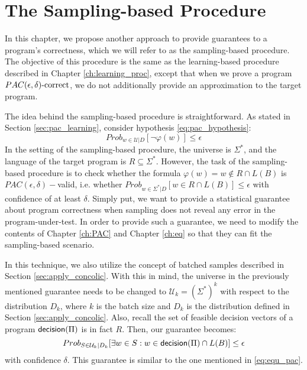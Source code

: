 \chapter{The Sampling-based Procedure}\label{ch:sampling_proc}

In this chapter, we propose another approach to provide guarantees to a program's correctness, which we will refer to as the sampling-based procedure. The objective of this procedure is the same as the learning-based procedure described in Chapter \ref{ch:learning_proc}, except that when we prove a program $PAC(\epsilon, \delta)\text{-correct}$, we do not additionally provide an approximation to the target program. 

The idea behind the sampling-based procedure is straightforward. As stated in Section \ref{sec:pac_learning}, consider hypothesis \ref{eq:pac_hypothesis}:
\begin{equation*}
Prob_{w \in \mathcal{U}|D} [\neg \varphi (w)] \leq \epsilon
\end{equation*}
In the setting of the sampling-based procedure, the universe is $\Sigma^\ast$, and the language of the target program is $R \subseteq \Sigma^\ast$. However, the task of the sampling-based procedure is to check whether the formula $\varphi(w) = w \notin R \cap L(B)$ is $PAC(\epsilon, \delta)-$valid, i.e. whether $Prob_{w \in \Sigma^\ast | D } [w \in R \cap L(B)] \leq \epsilon$ with confidence of at least $\delta$. Simply put, we want to provide a statistical guarantee about program correctness when sampling does not reveal any error in the program-under-test. In order to provide such a guarantee, we need to modify the contents of Chapter \ref{ch:PAC} and Chapter \ref{ch:eq} so that they can fit the sampling-based scenario.

In this technique, we also utilize the concept of batched samples described in Section \ref{sec:apply_concolic}. With this in mind, the universe in the previously mentioned guarantee needs to be changed to $\mathcal{U}_k = (\Sigma^\ast)^k$ with respect to the distribution $D_k$, where $k$ is the batch size and $D_k$ is the distribution defined in Section \ref{sec:apply_concolic}. Also, recall the set of feasible decision vectors of a program $\mathsf{decision}(\Pi)$ is in fact $R$. Then, our guarantee becomes:
\begin{equation}\label{eq:sampling_guarantee}
Prob_{S \in \mathcal{U}_k | D_k} [\exists w \in S : w \in \mathsf{decision}(\Pi) \cap L(B)] \leq \epsilon
\end{equation} 
with confidence $\delta$. This guarantee is similar to the one mentioned in \ref{eq:equ_pac}. 

